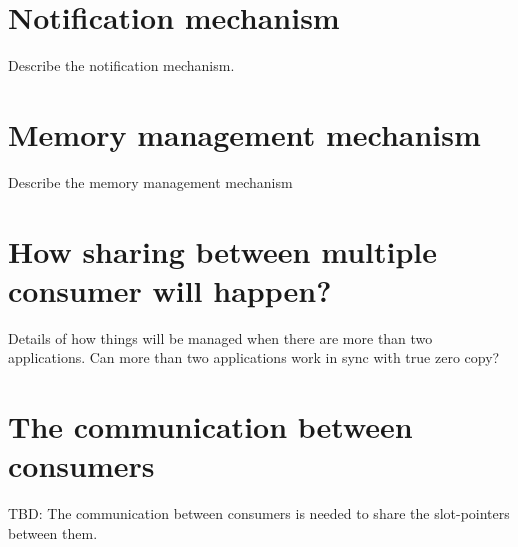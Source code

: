 \documentclass[a4paper,twoside]{report} %
\begin{document}
\section{Notification mechanism}
Describe the notification mechanism.

\section{Memory management mechanism}
Describe the memory management mechanism

\section{How sharing between multiple consumer will happen?}
Details of how things will be managed when there are more than two
applications. Can more than two applications work in sync with true 
zero copy?

\section{The communication between consumers}
TBD:  The communication between consumers is needed to share the
slot-pointers between them.
\end{document}
